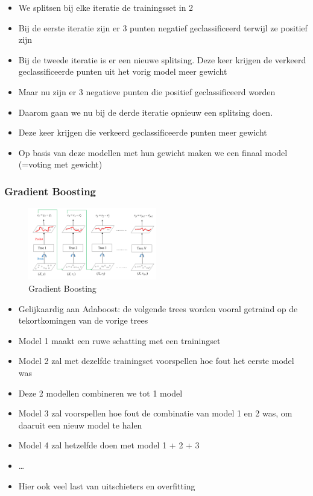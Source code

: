 \documentclass{article}
\begin{document}
\begin{itemize}
    \item We splitsen bij elke iteratie de trainingsset in 2
    \item Bij de eerste iteratie zijn er 3 punten negatief geclassificeerd terwijl ze positief zijn
    \item Bij de tweede iteratie is er een nieuwe splitsing. Deze keer krijgen de verkeerd geclassificeerde punten uit het vorig model meer gewicht
    \item Maar nu zijn er 3 negatieve punten die positief geclassificeerd worden
    \item Daarom gaan we nu bij de derde iteratie opnieuw een splitsing doen.
    \item Deze keer krijgen die verkeerd geclassificeerde punten meer gewicht
    \item Op basis van deze modellen met hun gewicht maken we een finaal model (=voting met gewicht)
\end{itemize}

\subsubsection{Gradient Boosting}

\begin{figure}[H]
    \centering
    \includegraphics[width=0.5\textwidth]{gradient-boosting.png}
    \caption{Gradient Boosting}
\end{figure}

\begin{itemize}
    \item Gelijkaardig aan Adaboost: de volgende trees worden vooral getraind op de tekortkomingen van de vorige trees
    \item Model 1 maakt een ruwe schatting met een trainingset
    \item Model 2 zal met dezelfde trainingset voorspellen hoe fout het eerste model was
    \item Deze 2 modellen combineren we tot 1 model
    \item Model 3 zal voorspellen hoe fout de combinatie van model 1 en 2 was, om daaruit een nieuw model te halen
    \item Model 4 zal hetzelfde doen met model 1 + 2 + 3
    \item \dots
    \item Hier ook veel last van uitschieters en overfitting
\end{itemize}
\end{document}
